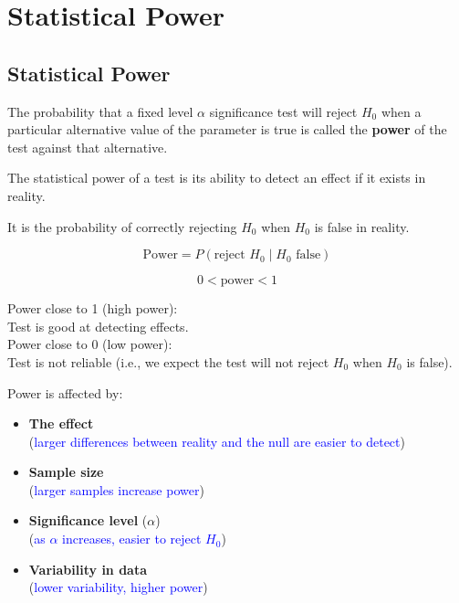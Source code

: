 \chapter{Statistical Power}
\section{Statistical Power}
\begin{definition}
The probability that a fixed level $\alpha$ significance test will reject $H_0$ when a particular alternative value of the parameter is true is called the \textbf{power} of the test against that alternative.
\end{definition}

The statistical power of a test is its ability to detect an effect if it exists in reality.

It is the probability of correctly rejecting $H_0$ when $H_0$ is false in reality.

\begin{equation*}
\text{Power} = P(\text{reject } H_0 \mid H_0 \text{ false})
\end{equation*}

\begin{equation*}
0 < \text{power} < 1
\end{equation*}

Power close to 1 (high power):\\
\quad Test is good at detecting effects.\\

Power close to 0 (low power):\\
\quad Test is not reliable (i.e., we expect the test will not reject $H_0$ when $H_0$ is false).

\vspace{1em}
Power is affected by:

\begin{itemize}
 \item \textbf{The effect} \\ (\textcolor{blue}{larger differences between reality and the null are easier to detect})

  \item \textbf{Sample size} \\ (\textcolor{blue}{larger samples increase power})

  \item \textbf{Significance level} ($\alpha$) \\ (\textcolor{blue}{as $\alpha$ increases, easier to reject $H_0$})

  \item \textbf{Variability in data} \\ (\textcolor{blue}{lower variability, higher power})
\end{itemize}
